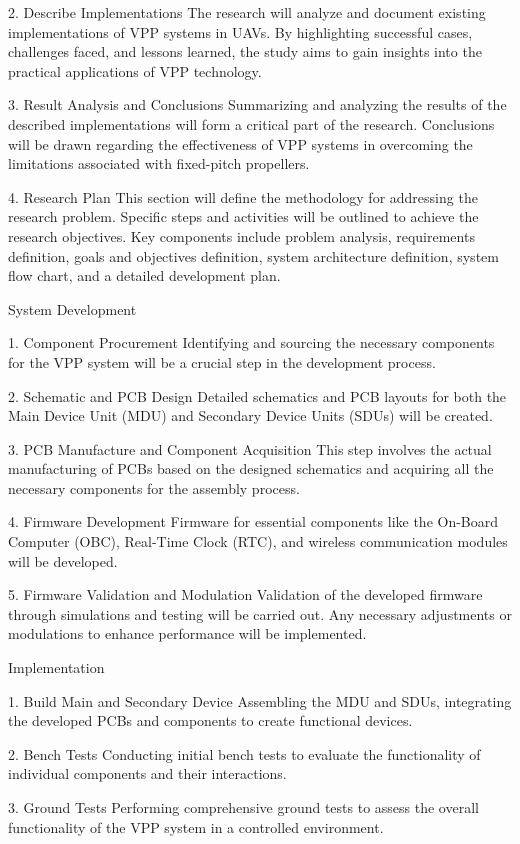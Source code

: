 2. Describe Implementations
The research will analyze and document existing implementations of VPP systems in UAVs. 
By highlighting successful cases, challenges faced, and lessons learned, the study aims to gain insights into the practical applications of VPP technology.

3. Result Analysis and Conclusions
Summarizing and analyzing the results of the described implementations will form a critical part of the research. 
Conclusions will be drawn regarding the effectiveness of VPP systems in overcoming the limitations associated with fixed-pitch propellers.

4. Research Plan
This section will define the methodology for addressing the research problem. 
Specific steps and activities will be outlined to achieve the research objectives. 
Key components include problem analysis, requirements definition, goals and objectives definition, system architecture definition, system flow chart, and a detailed development plan.

System Development

1. Component Procurement
Identifying and sourcing the necessary components for the VPP system will be a crucial step in the development process.

2. Schematic and PCB Design
Detailed schematics and PCB layouts for both the Main Device Unit (MDU) and Secondary Device Units (SDUs) will be created.

3. PCB Manufacture and Component Acquisition
This step involves the actual manufacturing of PCBs based on the designed schematics and acquiring all the necessary components for the assembly process.

4. Firmware Development
Firmware for essential components like the On-Board Computer (OBC), Real-Time Clock (RTC), and wireless communication modules will be developed.

5. Firmware Validation and Modulation
Validation of the developed firmware through simulations and testing will be carried out.
Any necessary adjustments or modulations to enhance performance will be implemented.

Implementation

1. Build Main and Secondary Device
Assembling the MDU and SDUs, integrating the developed PCBs and components to create functional devices.

2. Bench Tests
Conducting initial bench tests to evaluate the functionality of individual components and their interactions.

3. Ground Tests
Performing comprehensive ground tests to assess the overall functionality of the VPP system in a controlled environment.

